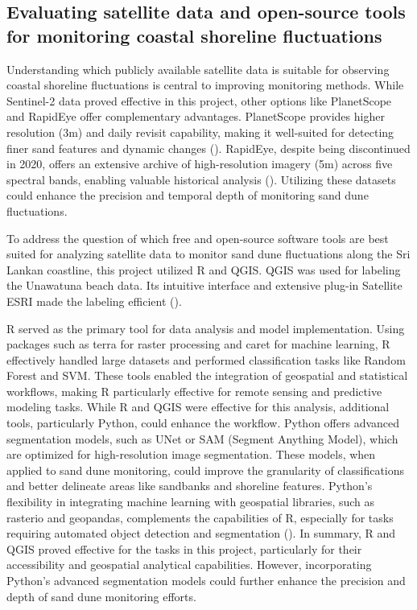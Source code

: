 \documentclass[a4paper,12pt]{article}
\begin{document}
\subsection{Evaluating satellite data and open-source tools for monitoring coastal shoreline fluctuations}
Understanding which publicly available satellite data is suitable for observing coastal shoreline fluctuations is central to improving monitoring methods. While Sentinel-2 data proved effective in this project, other options like PlanetScope and RapidEye offer complementary advantages. PlanetScope provides higher resolution (3m) and daily revisit capability, making it well-suited for detecting finer sand features and dynamic changes (\cite{planet_planetscope_2024}). RapidEye, despite being discontinued in 2020, offers an extensive archive of high-resolution imagery (5m) across five spectral bands, enabling valuable historical analysis (\cite{planet_rapideye_2024}). Utilizing these datasets could enhance the precision and temporal depth of monitoring sand dune fluctuations.

To address the question of which free and open-source software tools are best suited for analyzing satellite data to monitor sand dune fluctuations along the Sri Lankan coastline, this project utilized R and QGIS.
QGIS was used for labeling the Unawatuna beach data. Its intuitive interface and extensive plug-in Satellite ESRI made the labeling efficient (\cite{gisgeography_sentinel_2019}).

R served as the primary tool for data analysis and model implementation. Using packages such as terra for raster processing and caret for machine learning, R effectively handled large datasets and performed classification tasks like Random Forest and SVM. These tools enabled the integration of geospatial and statistical workflows, making R particularly effective for remote sensing and predictive modeling tasks.
While R and QGIS were effective for this analysis, additional tools, particularly Python, could enhance the workflow. Python offers advanced segmentation models, such as UNet or SAM (Segment Anything Model), which are optimized for high-resolution image segmentation. These models, when applied to sand dune monitoring, could improve the granularity of classifications and better delineate areas like sandbanks and shoreline features. Python’s flexibility in integrating machine learning with geospatial libraries, such as rasterio and geopandas, complements the capabilities of R, especially for tasks requiring automated object detection and segmentation (\cite{chege_comparing_2024}).
In summary, R and QGIS proved effective for the tasks in this project, particularly for their accessibility and geospatial analytical capabilities. However, incorporating Python's advanced segmentation models could further enhance the precision and depth of sand dune monitoring efforts.
\end{document}
